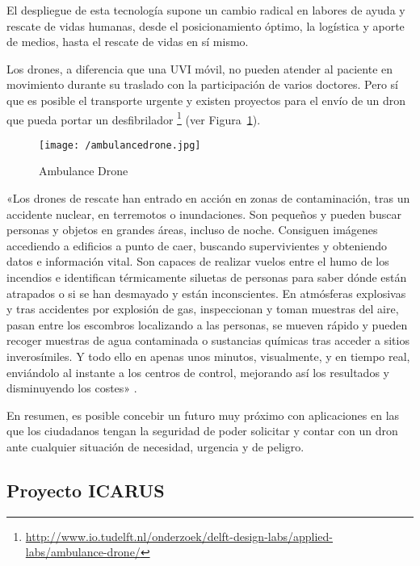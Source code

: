 El despliegue de esta tecnología supone un cambio radical en labores de ayuda y rescate de vidas humanas, desde el posicionamiento óptimo, la logística y aporte de medios, hasta el rescate de vidas en sí mismo.

Los drones, a diferencia que una UVI móvil, no pueden atender al paciente en movimiento durante su traslado con la participación de varios doctores. Pero sí que es posible el transporte urgente y existen proyectos para el envío de un dron que pueda portar un desfibrilador \footnote{\url{http://www.io.tudelft.nl/onderzoek/delft-design-labs/applied-labs/ambulance-drone/}} (ver Figura~\ref{fig:ambulancedrone}).

\begin{figure}[!h]
\begin{center}
\texttt{[image: /ambulancedrone.jpg]}
\caption[Ambulance Drone]{Ambulance Drone}
\label{fig:ambulancedrone}
\end{center}
\end{figure}

«Los drones de rescate han entrado en acción en zonas de contaminación, tras un accidente nuclear, en terremotos o inundaciones. Son pequeños y pueden buscar personas y objetos en grandes áreas, incluso de noche. Consiguen imágenes accediendo a edificios a punto de caer, buscando supervivientes y obteniendo datos e información vital. Son capaces de realizar vuelos entre el humo de los incendios e identifican térmicamente siluetas de personas para saber dónde están atrapados o si se han desmayado y están inconscientes. En atmósferas explosivas y tras accidentes por explosión de gas, inspeccionan y toman muestras del aire, pasan entre los escombros localizando a las personas, se mueven rápido y pueden recoger muestras de agua contaminada o sustancias químicas tras acceder a sitios inverosímiles. Y todo ello en apenas unos minutos, visualmente, y en tiempo real, enviándolo al instante a los centros de control, mejorando así los resultados y disminuyendo los costes» \cite{dron3}.

En resumen, es posible concebir un futuro muy próximo con aplicaciones en las que los ciudadanos tengan la seguridad de poder solicitar y contar con un dron ante cualquier situación de necesidad, urgencia y de peligro.

\subsection{Proyecto ICARUS}
\label{sec:icarus}

